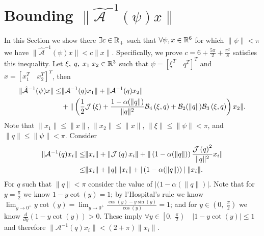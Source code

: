 \section{Bounding $\|\hat{\mathcal{A}}^{-1}(\psi)x\|$}
\label{appenJacSE3.sec.normBound}

In this Section we show there $\exists c\in\mathbb{R}^{}_+$ such
that $\forall\psi,x\in\mathbb{R}^{6}$ for which $\|\psi\|<\pi$ we have
$\|\hat{\mathcal{A}}^{-1}(\psi)x\| <c\|x\|$.
%
Specifically, we prove  $c=6+\frac{5\pi}{2}+\frac{\pi^2}{8}$ satisfies this
inequality. %
%
Let $\xi,\;q,\;x_1\;x_2\in\mathbb{R}^{3}$ such that
$\psi=[\xi^T \quad q^T ]^T$ and
$x=[ x_1^T \quad x_2^T ]^T$, then
%
\begin{align}
\|\hat{\mathcal{A}}^{-1}(\psi)x\|\leq&\|\mathcal{A}^{-1}(q)x_1\|+\|\mathcal{A}^{-1}(q)x_2\|
\nonumber \\
    &+\|\left( \frac{1}{2}\mathcal{J}\left( \xi \right) + 
                           \frac{1-\alpha(\|q\|)}{\|q\|^2}\mathcal{B}_4\left( \xi, q\right) 
                           +\mathcal{B}_2(\|q\|)\mathcal{B}_3\left( \xi, q\right)   \right)x_2\|.
\label{appenJacSE3.eq.interimBound}
\end{align}
%
Note that $\|x_1\|\leq\|x\|$, $\|x_2\|\leq\|x\|$,
$\|\xi\|\leq\|\psi\|<\pi$, and $\|q\|\leq\|\psi\|<\pi$. Consider
%
\begin{align}
\|\mathcal{A}^{-1}(q)x_i\|
   \leq&\|x_i\|+\|\mathcal{J}\left( q \right)x_i\|+
        \|\left(1-\alpha(\|q\|)\right)\frac{\mathcal{J}\left( q \right)^2}{\|q\|^2}x_i\|
\nonumber \\
   \leq&\|x_i\|+\|q\|\|x_i\|+
        |\left(1-\alpha(\|q\|)\right)|\;\|x_i\|.
\end{align}
%
For $q$ such that $\|q\|<\pi$ consider the value of
$|(1-\alpha(\|q\|)|$.  Note that 
for $y=\frac{\pi}{2}$ we know $1-y\cot(y)=1$;  by l'Hospital's rule we know
%
$\lim_{y\rightarrow 0^+}y\cot(y)=\lim_{y\rightarrow 0^+}\frac{\cos(y)-y\sin(y)}{\cos(y)}=1$;
%
and for $y\in\left(0,\; \frac{\pi}{2} \right)$ we know
$\frac{d}{dy}\left(1-y\cot(y) \right)>0$.  These imply
$\forall y\in\left[0,\; \frac{\pi}{2} \right)\quad |1-y\cot(y)| \leq
1$ and therefore
$\|\mathcal{A}^{-1}(q)x_i\|<\left(2+\pi\right)\|x_i\|$.
%
%

